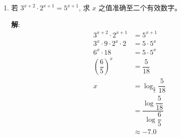 \documentclass{report}
\newcommand{\sol}{\vspace{0.2cm}\textbf{解}:}
\begin{document}
\begin{multicols*}{2}
\begin{enumerate}[leftmargin=*]
              \sol{}
              \begin{align*}
                  9^x - 27^y          & = 0                           \\
                  3^{2x} - 3^{3y}     & = 0                           \\
                  2x                  & = 3y                          \\
                  x                   & = \dfrac{3}{2} y\ \cdots\ (1) \\
                  \\
                  4^x \cdot 8^y       & = \dfrac{1}{16}               \\
                  2^{2x} \cdot 2^{3y} & = 2^{-4}                      \\
                  2x + 3y             & = -4\ \cdots\ (2)
              \end{align*}
              将 $(1)$ 代入 $(2)$, 得
              \begin{align*}
                  2 \cdot \dfrac{3}{2} y + 3y & = -4            \\
                  6y                          & = -4            \\
                  y                           & = -\dfrac{2}{3}
              \end{align*}
              将 $y = -\dfrac{2}{3}$ 代入 $(1)$, 得
              \begin{align*}
                  x & = \dfrac{3}{2} \cdot \left(-\dfrac{2}{3}\right) = -1
              \end{align*}
              $\therefore\ x = -1, y = -\dfrac{2}{3}$.

        \item 若 $3^{x+2} \cdot 2^{x+1}=5^{x+1}$, 求 $x$ 之值准确至二个有效数字。

              \sol{}
              \begin{align*}
                  3^{x+2} \cdot 2^{x+1}         & = 5^{x+1}                                       \\
                  3^x \cdot 9 \cdot 2^x \cdot 2 & = 5 \cdot 5^x                                   \\
                  6^x \cdot 18                  & = 5 \cdot 5^x                                   \\
                  \left(\dfrac{6}{5}\right)^x   & = \dfrac{5}{18}                                 \\
                  x                             & = \log_{\frac{6}{5}} \dfrac{5}{18}              \\
                                                & = \dfrac{\log \dfrac{5}{18}}{\log \dfrac{6}{5}} \\
                                                & \approx -7.0
              \end{align*}


\end{enumerate}
\end{multicols*}
\end{document}
